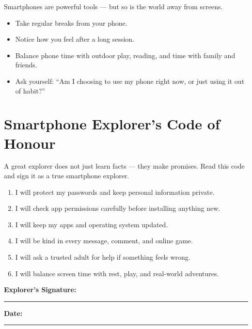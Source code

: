 Smartphones are powerful tools — but so is the world away from screens.
\begin{itemize}
  \item Take regular breaks from your phone.
  \item Notice how you feel after a long session.
  \item Balance phone time with outdoor play, reading, and time with family and friends.
  \item Ask yourself: ``Am I choosing to use my phone right now, or just using it out of habit?''
\end{itemize}

\sectionrule

\section*{Smartphone Explorer's Code of Honour}

\begin{picturethis}
  A great explorer does not just learn facts — they make promises.
  Read this code and sign it as a true smartphone explorer.
\end{picturethis}

\begin{enumerate}[label=\textbf{\arabic*.}]
  \item I will protect my passwords and keep personal information private.
  \item I will check app permissions carefully before installing anything new.
  \item I will keep my apps and operating system updated.
  \item I will be kind in every message, comment, and online game.
  \item I will ask a trusted adult for help if something feels wrong.
  \item I will balance screen time with rest, play, and real-world adventures.
\end{enumerate}

\vspace{6pt}
\begin{center}
  \begin{tcolorbox}[colback=SunYellow!15,colframe=SunYellow!70!black,arc=8pt,boxrule=1pt,width=0.9\linewidth]
    \textbf{Explorer's Signature:} \rule{0.48\linewidth}{0.4pt}\hfill
    \textbf{Date:} \rule{0.2\linewidth}{0.4pt}
  \end{tcolorbox}
\end{center}


